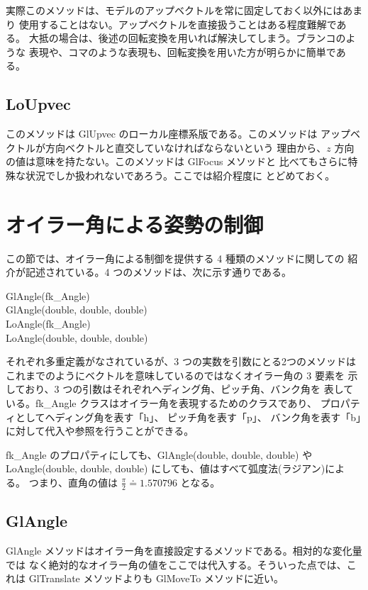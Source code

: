 実際このメソッドは、モデルのアップベクトルを常に固定しておく以外にはあまり
使用することはない。アップベクトルを直接扱うことはある程度難解である。
大抵の場合は、後述の回転変換を用いれば解決してしまう。ブランコのような
表現や、コマのような表現も、回転変換を用いた方が明らかに簡単である。

\subsection{LoUpvec}
このメソッドは GlUpvec のローカル座標系版である。このメソッドは
アップベクトルが方向ベクトルと直交していなければならないという
理由から、\(z\) 方向の値は意味を持たない。このメソッドは GlFocus メソッドと
比べてもさらに特殊な状況でしか扱われないであろう。ここでは紹介程度に
とどめておく。

\section{オイラー角による姿勢の制御}
この節では、オイラー角による制御を提供する 4 種類のメソッドに関しての
紹介が記述されている。4 つのメソッドは、次に示す通りである。
\begin{description}
\item[GlAngle(fk\_Angle)]
\item[GlAngle(double, double, double)]
\item[LoAngle(fk\_Angle)]
\item[LoAngle(double, double, double)]
\end{description}

それぞれ多重定義がなされているが、3 つの実数を引数にとる2つのメソッドは
これまでのようにベクトルを意味しているのではなくオイラー角の 3 要素を
示しており、3 つの引数はそれぞれヘディング角、ピッチ角、バンク角を
表している。fk\_Angle クラスはオイラー角を表現するためのクラスであり、
プロパティとしてヘディング角を表す「h」、
ピッチ角を表す「p」、
バンク角を表す「b」に対して代入や参照を行うことができる。

fk\_Angle のプロパティにしても、GlAngle(double, double, double) や
LoAngle(double, double, double) にしても、値はすべて弧度法(ラジアン)による。
つまり、直角の値は \(\frac{\pi}{2} \doteq 1.570796\) となる。

\subsection{GlAngle}
GlAngle メソッドはオイラー角を直接設定するメソッドである。相対的な変化量では
なく絶対的なオイラー角の値をここでは代入する。そういった点では、これは
GlTranslate メソッドよりも GlMoveTo メソッドに近い。

